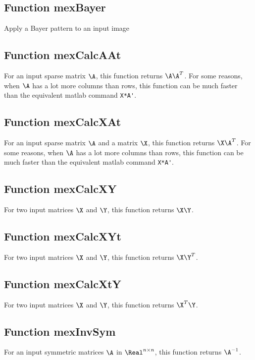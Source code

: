 \documentclass[a4paper, 11pt]{article}
\begin{document}
\subsection{Function mexBayer}

Apply a Bayer pattern to an input image
{\footnotesize

}


\subsection{Function mexCalcAAt}

For an input sparse matrix $\A$, this function returns $\A\A^T$. For some reasons, when $\A$ has a lot more columns than rows, this function can be much faster than the equivalent matlab command \verb|X*A'|. 
{\footnotesize

}

\subsection{Function mexCalcXAt}
For an input sparse matrix $\A$ and a matrix $\X$, this function returns $\X\A^T$. For some reasons, when $\A$ has a lot more columns than rows, this function can be much faster than the equivalent matlab command \verb|X*A'|. 
{\footnotesize

}

\subsection{Function mexCalcXY}
For two input matrices $\X$ and $\Y$, this function returns $\X\Y$. 
{\footnotesize

}

\subsection{Function mexCalcXYt}
For two input matrices $\X$ and $\Y$, this function returns $\X\Y^T$.
{\footnotesize

}


\subsection{Function mexCalcXtY}
For two input matrices $\X$ and $\Y$, this function returns $\X^T\Y$.
{\footnotesize

}


\subsection{Function mexInvSym}
For an input symmetric matrices $\A$ in $\Real^{n \times n}$, this function returns $\A^{-1}$.
{\footnotesize

}
\end{document}
